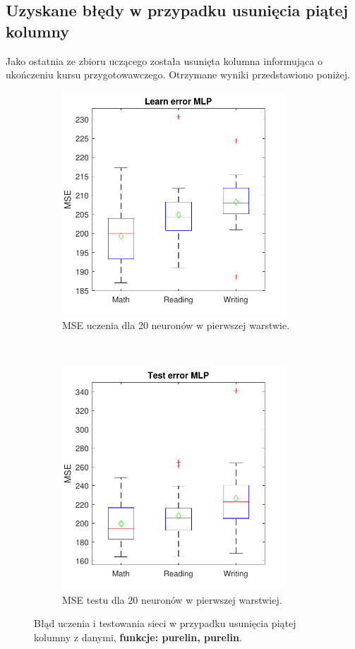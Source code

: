 \documentclass[12pt]{article}
\begin{document}
\subsection{Uzyskane błędy w przypadku usunięcia piątej kolumny}
Jako ostatnia ze zbioru uczącego została usunięta kolumna informująca o ukończeniu kursu przygotowawczego. Otrzymane wyniki przedstawiono poniżej.
\begin{figure}[H]
\centering
\begin{subfigure}[t]{0.48\textwidth} 
\centering
\includegraphics[height=3.3in]{purelin_purelin_20_without_5_learnBoxplot.pdf}
\caption{MSE uczenia dla  20 neuronów w pierwszej warstwie.}
\end{subfigure}
~~
\begin{subfigure}[t]{0.48\textwidth} 
\centering
\includegraphics[height=3.3in]{purelin_purelin_20_without_5_testBoxplot.pdf}
\caption{MSE testu dla  20  neuronów w pierwszej warstwiej.}
\end{subfigure}

\caption{Błąd uczenia i testowania sieci w przypadku usunięcia piątej  kolumny z danymi, \textbf{funkcje: purelin, purelin}.}
\end{figure}
\end{document}
